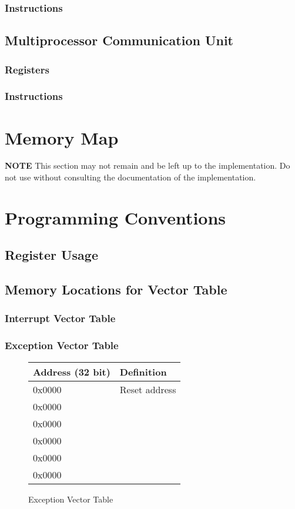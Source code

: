 \documentclass[letterpaper, 11pt]{article}
\begin{document}
\subsubsection{Instructions}
\subsection{Multiprocessor Communication Unit}
\subsubsection{Registers}
\subsubsection{Instructions}

\section{Memory Map}
\textbf{NOTE}
This section may not remain and be left up to the implementation. Do not use without consulting
the documentation of the implementation.
\section{Programming Conventions}
\subsection{Register Usage}
\subsection{Memory Locations for Vector Table}
\subsubsection{Interrupt Vector Table}
\subsubsection{Exception Vector Table}


\begin{figure}[!h]
	\begin{center}
		\begin{tabular}{|l|l|}
			\hline
			Address (32 bit) &  Definition\\ \hline
			0x0000 & Reset address \\ 	\hline
			0x0000 &  \\ 	\hline
			0x0000 &  \\ 	\hline
			0x0000 &  \\ 	\hline
			0x0000 &  \\ 	\hline
			0x0000 &  \\	\hline
		\end{tabular} 
		\caption{Exception Vector Table}
	\end{center}
	
\end{figure}
\end{document}
